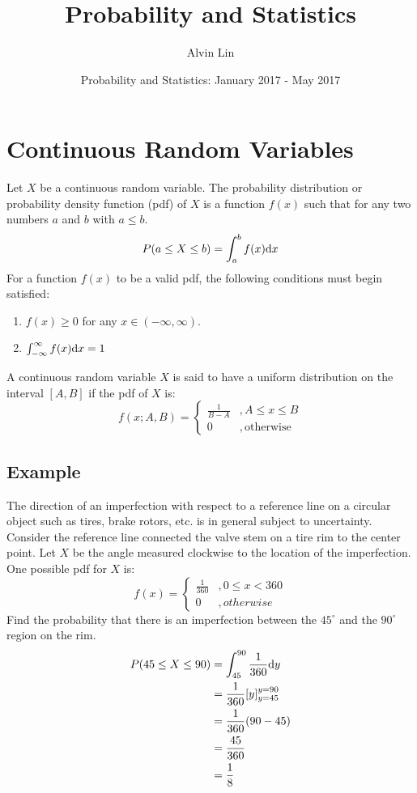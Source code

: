 \documentclass[letterpaper, 12pt]{math}
\title{Probability and Statistics}
\author{Alvin Lin}
\date{Probability and Statistics: January 2017 - May 2017}
\begin{document}
\maketitle

\section*{Continuous Random Variables}
Let \( X \) be a continuous random variable. The probability distribution or
probability density function (pdf) of \( X \) is a function \( f(x) \) such that
for any two numbers \( a \) and \( b \) with \( a \leq b \).
\[ P(a\leq X\leq b) = \int_{a}^{b}f(x)\mathrm{d}{x} \]
For a function \( f(x) \) to be a valid pdf, the following conditions must begin
satisfied:
\begin{enumerate}
  \item \( f(x) \geq 0 \) for any \( x \in (-\infty,\infty) \).
  \item \( \int_{-\infty}^{\infty}f(x)\mathrm{d}{x} = 1 \)
\end{enumerate}
A continuous random variable \( X \) is said to have a uniform distribution on
the interval \( [A,B] \) if the pdf of \( X \) is:
\[ f(x;A,B) =
  \begin{cases}
    \frac{1}{B-A} &, A\leq x\leq B \\
    0 &, \mathrm{otherwise}
  \end{cases}
\]

\subsection*{Example}
The direction of an imperfection with respect to a reference line on a
circular object such as tires, brake rotors, etc. is in general subject to
uncertainty. Consider the reference line connected the valve stem on a tire rim
to the center point. Let \( X \) be the angle measured clockwise to the location
of the imperfection. One possible pdf for \( X \) is:
\[ f(x) =
  \begin{cases}
    \frac{1}{360} &, 0 \leq x < 360 \\
    0 &, otherwise
  \end{cases}
\]
Find the probability that there is an imperfection between the \( 45^{\circ} \)
and the \( 90^{\circ} \) region on the rim.
\begin{align*}
  P(45\leq X\leq 90) &= \int_{45}^{90}\frac{1}{360}\mathrm{d}{y} \\
  &= \frac{1}{360}[y]_{y=45}^{y=90} \\
  &= \frac{1}{360}(90-45) \\
  &= \frac{45}{360} \\
  &= \frac{1}{8}
\end{align*}
\end{document}
